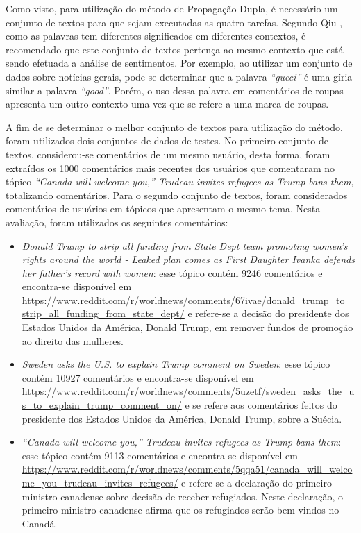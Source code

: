Como visto, para utilização do método de Propagação Dupla, é necessário um
conjunto de textos para que sejam executadas as quatro tarefas. Segundo Qiu
\cite{Qiu:2011:OWE:1970420.1970422}, como as palavras tem diferentes
significados em diferentes contextos, é recomendado que este conjunto de textos
pertença ao mesmo contexto que está sendo efetuada a análise de sentimentos. Por
exemplo, ao utilizar um conjunto de dados sobre notícias gerais, pode-se
determinar que a palavra \textit{``gucci''} é uma gíria similar a palavra
\textit{``good''}. Porém, o uso dessa palavra em comentários de roupas
apresenta um outro contexto uma vez que se refere a uma marca de roupas.

A fim de se determinar o
melhor conjunto de textos para utilização do método, foram utilizados dois
conjuntos de dados de testes. No primeiro conjunto de textos, considerou-se
comentários de um mesmo usuário, desta forma, foram extraídos os 1000
comentários mais recentes dos usuários que comentaram no tópico \textit{``Canada will welcome
you,” Trudeau invites refugees as Trump bans them}, totalizando %
comentários. Para o segundo
conjunto de textos, foram considerados comentários de usuários em tópicos
que apresentam o mesmo tema. Nesta avaliação, foram utilizados os seguintes
comentários:

\begin{itemize}
  \item
  \textit{Donald Trump to strip all funding from State Dept team promoting
  women's rights around the world - Leaked plan comes as First Daughter Ivanka
  defends her father's record with women}: esse tópico contém 9246
  comentários e encontra-se disponível em
  \url{https://www.reddit.com/r/worldnews/comments/67ivae/donald_trump_to_strip_all_funding_from_state_dept/}
  e refere-se a decisão do presidente dos Estados Unidos da América, Donald
  Trump, em remover fundos de promoção ao direito das mulheres.  
  \item
  \textit{Sweden asks the U.S. to explain Trump comment on
  Sweden}: esse tópico contém 10927
  comentários e encontra-se disponível em
  \url{https://www.reddit.com/r/worldnews/comments/5uzetf/sweden_asks_the_us_to_explain_trump_comment_on/}
  e se refere aos comentários feitos do presidente dos Estados Unidos da
  América, Donald Trump, sobre a Suécia.
  
  \item\textit{“Canada will welcome you,” Trudeau invites refugees as Trump bans
  them}: esse tópico contém 9113
  comentários e encontra-se disponível em
  \url{https://www.reddit.com/r/worldnews/comments/5qqa51/canada_will_welcome_you_trudeau_invites_refugees/}
  e refere-se a declaração do primeiro ministro canadense sobre decisão de
  receber refugiados. Neste declaração, o primeiro ministro canadense afirma que
  os refugiados serão bem-vindos no Canadá.
\end{itemize}
 
